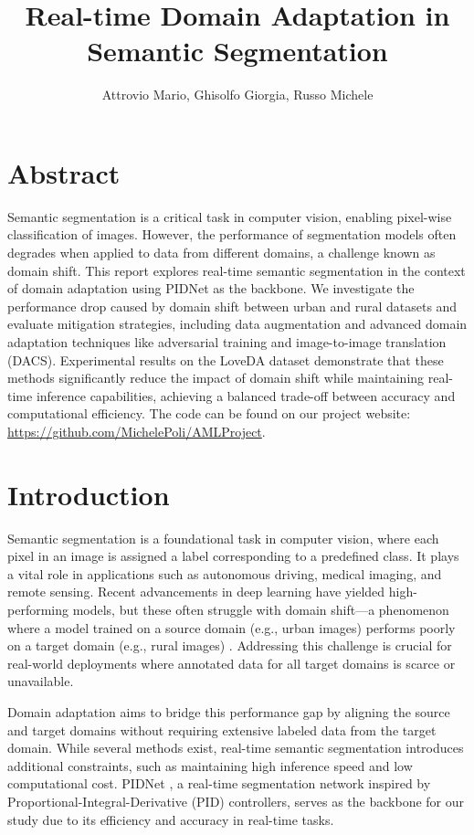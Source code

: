 \documentclass{article}
\title{Real-time Domain Adaptation in Semantic Segmentation}
\author{Attrovio Mario, Ghisolfo Giorgia, Russo Michele}
\begin{document}
	\maketitle
	
	
	
	\begin{multicols}{2}
		
		
		
		\section{Abstract}
		Semantic segmentation is a critical task in computer vision, enabling pixel-wise classification of images. However, the performance of segmentation models often degrades when applied to data from different domains, a challenge known as domain shift. This report explores real-time semantic segmentation in the context of domain adaptation using PIDNet as the backbone. We investigate the performance drop caused by domain shift between urban and rural datasets and evaluate mitigation strategies, including data augmentation and advanced domain adaptation techniques like adversarial training and image-to-image translation (DACS). Experimental results on the LoveDA dataset demonstrate that these methods significantly reduce the impact of domain shift while maintaining real-time inference capabilities, achieving a balanced trade-off between accuracy and computational efficiency. The code can be found on our project website: \url{https://github.com/MichelePoli/AMLProject}.
		
		\section{Introduction}
		Semantic segmentation is a foundational task in computer vision, where each pixel in an image is assigned a label corresponding to a predefined class. It plays a vital role in applications such as autonomous driving, medical imaging, and remote sensing. Recent advancements in deep learning have yielded high-performing models, but these often struggle with domain shift—a phenomenon where a model trained on a source domain (e.g., urban images) performs poorly on a target domain (e.g., rural images) \cite{loveda2021}. Addressing this challenge is crucial for real-world deployments where annotated data for all target domains is scarce or unavailable.
		
		Domain adaptation aims to bridge this performance gap by aligning the source and target domains without requiring extensive labeled data from the target domain. While several methods exist, real-time semantic segmentation introduces additional constraints, such as maintaining high inference speed and low computational cost. PIDNet \cite{pidnet2023}, a real-time segmentation network inspired by Proportional-Integral-Derivative (PID) controllers, serves as the backbone for our study due to its efficiency and accuracy in real-time tasks.
		

\end{multicols}
\end{document}
